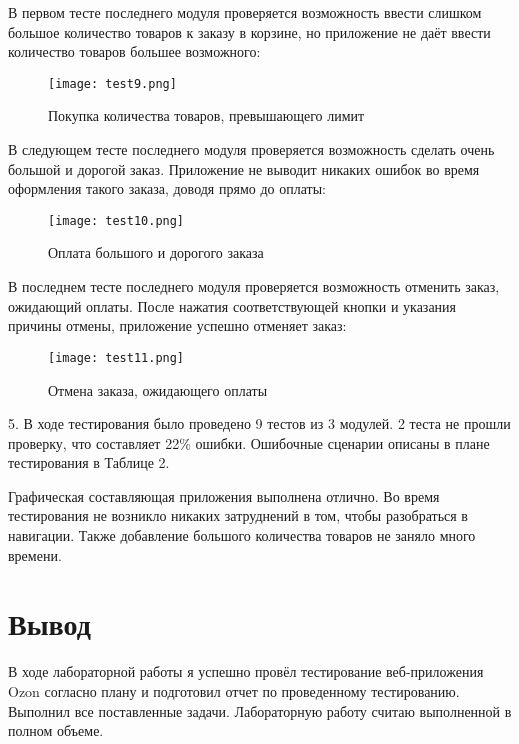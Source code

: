 \documentclass[12pt]{article}
\begin{document}
    \newpage

    В первом тесте последнего модуля проверяется возможность ввести слишком большое количество товаров к заказу в корзине, но приложение не даёт ввести количество товаров большее возможного:

    \begin{figure}[h]
        \texttt{[image: test9.png]}
        \centering
        \caption{Покупка  количества товаров, превышающего лимит}
    \end{figure}

    В следующем тесте последнего модуля проверяется возможность сделать очень большой и дорогой заказ. Приложение не выводит никаких ошибок во время оформления такого заказа, доводя прямо до оплаты:

    \begin{figure}[h]
        \texttt{[image: test10.png]}
        \centering
        \caption{Оплата   большого и дорогого заказа}
    \end{figure}

    \newpage

    В последнем тесте последнего модуля проверяется возможность отменить заказ, ожидающий оплаты. После нажатия соответствующей кнопки и указания причины отмены, приложение успешно отменяет заказ:

    \begin{figure}[h]
        \texttt{[image: test11.png]}
        \centering
        \caption{Отмена заказа, ожидающего оплаты}
    \end{figure}



    5. В ходе тестирования было проведено 9 тестов из 3 модулей. 2 теста не прошли проверку, что составляет 22\% ошибки. Ошибочные сценарии описаны в плане тестирования в Таблице 2.

    Графическая составляющая приложения выполнена отлично. Во время тестирования не возникло никаких затруднений в том, чтобы разобраться в навигации. Также добавление большого количества товаров не заняло много времени.

    \section*{Вывод}

    В ходе лабораторной работы я успешно провёл тестирование веб-приложения Ozon согласно плану и подготовил отчет по проведенному тестированию. Выполнил все поставленные задачи. Лабораторную работу считаю выполненной в полном объеме.
\end{document}
